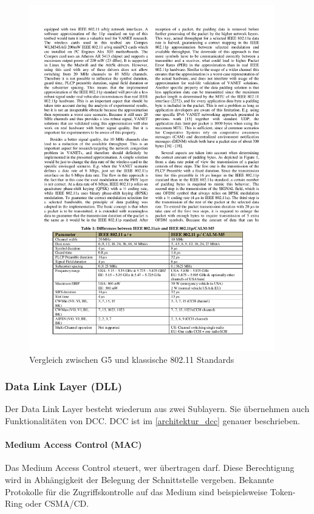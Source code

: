 \begin{figure}
	\includegraphics[width=0.95\textwidth]{content/images/02_architektur/unterschiede-G5-Wlan.pdf}
	\caption{Vergleich zwischen G5 und klassische 802.11 Standards}
	\label{fig:architektur_vergleich-G5-802}
\end{figure}

\subsubsection{Data Link Layer (DLL)}
Der Data Link Layer besteht wiederum aus zwei Sublayern. Sie übernehmen auch Funktionalitäten von \ac{DCC}. \ac{DCC} ist im \autoref{architektur_dcc} genauer beschrieben. 
\paragraph{Medium Access Control (MAC)}
Das Medium Access Control steuert, wer übertragen darf. Diese Berechtigung wird in Abhängigkeit der Belegung der Schnittstelle vergeben. Bekannte Protokolle für die Zugriffskontrolle auf das Medium sind beispielsweise Token-Ring oder CSMA/CD. 

